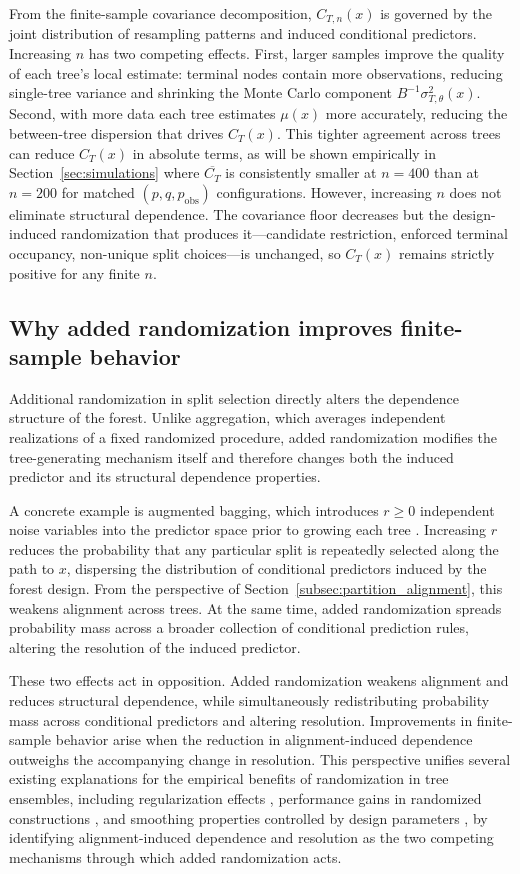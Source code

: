 \documentclass[11pt]{article}
\theoremstyle{plain}
\theoremstyle{definition}
\theoremstyle{remark}
\begin{document}
From the finite-sample covariance decomposition, $C_{T,n}(x)$ is governed by the joint distribution of resampling patterns and induced conditional predictors. Increasing $n$ has two competing effects. First, larger samples improve the quality of each tree's local estimate: terminal nodes contain more observations, reducing single-tree variance and shrinking the Monte Carlo component $B^{-1}\sigma^2_{T,\theta}(x)$. Second, with more data each tree estimates $\mu(x)$ more accurately, reducing the between-tree dispersion that drives $C_T(x)$. This tighter agreement across trees can reduce $C_T(x)$ in absolute terms, as will be shown empirically in Section~\ref{sec:simulations} where $\overline{C_T}$ is consistently smaller at $n = 400$ than at $n = 200$ for matched $(p, q, p_{\mathrm{obs}})$ configurations. However, increasing $n$ does not eliminate structural dependence. The covariance floor decreases but the design-induced randomization that produces it---candidate restriction, enforced terminal occupancy, non-unique split choices---is unchanged, so $C_T(x)$ remains strictly positive for any finite $n$.

\subsection{Why added randomization improves finite-sample behavior}
\label{subsec:why_randomness}

Additional randomization in split selection directly alters the dependence structure of the forest. Unlike aggregation, which averages independent realizations of a fixed randomized procedure, added randomization modifies the tree-generating mechanism itself and therefore changes both the induced predictor and its structural dependence properties.

A concrete example is augmented bagging, which introduces $r\ge0$ independent noise variables into the predictor space prior to growing each tree \citep{mentch2022}. Increasing $r$ reduces the probability that any particular split is repeatedly selected along the path to $x$, dispersing the distribution of conditional predictors induced by the forest design. From the perspective of Section~\ref{subsec:partition_alignment}, this weakens alignment across trees. At the same time, added randomization spreads probability mass across a broader collection of conditional prediction rules, altering the resolution of the induced predictor.

These two effects act in opposition. Added randomization weakens alignment and reduces structural dependence, while simultaneously redistributing probability mass across conditional predictors and altering resolution. Improvements in finite-sample behavior arise when the reduction in alignment-induced dependence outweighs the accompanying change in resolution. This perspective unifies several existing explanations for the empirical benefits of randomization in tree ensembles, including regularization effects \citep{mentch2020}, performance gains in randomized constructions \citep{liu2025}, and smoothing properties controlled by design parameters \citep{curth2024}, by identifying alignment-induced dependence and resolution as the two competing mechanisms through which added randomization acts.
\end{document}
